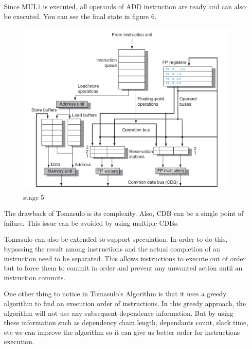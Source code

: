 \documentclass[12pt]{article}
\begin{document}
Since MUL1 is executed, all operands of ADD instruction are ready and can also be executed. You can see the final state in figure 6.

\begin{figure}[H]
	\centering
	\includegraphics[width=1\textwidth]{./images/tomas/e5.png}	
	\cprotect\caption{stage 5}
\end{figure}


The drawback of Tomasulo is its complexity. Also, CDB can be a single point of failure. This issue can be avoided by using multiple CDBs.

Tomasulo can also be extended to support speculation. In order to do this, bypassing the result among instructions and the actual completion of an instruction need to be separated. This allows instructions to execute
out of order but to force them to commit in order and prevent any unwanted action until an instruction commits.

One other thing to notice in Tomasulo’s Algorithm is that it uses a greedy algorithm to find an execution order of instructions.
In this greedy approach, the algorithm will not use any subsequent dependence information. But by using these information such as dependency chain length, dependants count, slack time, etc we can improve the algorithm so it can give us better order for instructions execution.


\end{document}
